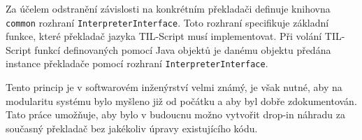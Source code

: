 Za účelem odstranění závislosti na konkrétním překladači definuje knihovna \lstinline{common}
rozhraní \lstinline{InterpreterInterface}. Toto rozhraní specifikuje základní funkce, které
překladač jazyka TIL-Script musí implementovat. Při volání TIL-Script funkcí definovaných pomocí
Java objektů je danému objektu předána instance překladače pomocí rozhraní
\lstinline{InterpreterInterface}.

Tento princip je v softwarovém inženýrství velmi známý, je však nutné, aby na modularitu systému
bylo myšleno již od počátku a aby byl dobře zdokumentován. Tato práce umožňuje, aby bylo v budoucnu
možno vytvořit drop-in náhradu za současný překladač bez jakékoliv úpravy existujícího kódu.

\endinput
